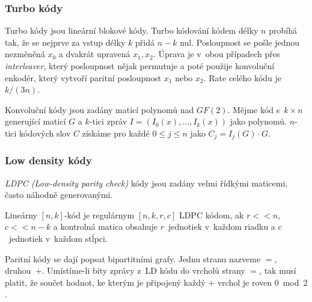 \subsubsection{Turbo kódy}
Turbo kódy jsou lineární blokové kódy.
Turbo kódování kódem délky $n$ probíhá tak, že se nejprve za vstup délky $k$ přidá $n -
k$ nul. Posloupnost se pošle jednou nezměněná $x_0$ a dvakrát upravená
$x_1, x_2$. Úprava
je v~obou případech přes {\em interleaver}, který posloupnost nějak
permutuje a poté použije konvoluční enkodér, který vytvoří paritní
posloupnost $x_1$ nebo $x_2$. Rate celého kódu je $k/(3n)$.

Konvoluční kódy jsou zadány maticí polynomů nad $GF(2)$. Mějme kód
s~$k\times n$ generující maticí $G$ a $k$-tici zpráv
$I = (I_0(x),\ldots,I_k(x))$ jako polynomů. $n$-tici kódových slov
$C$ získáme pro každé $0 \leq j \leq n$ jako $C_j = I_j(G) \cdot G$.

\subsubsection{Low density kódy}


{\em LDPC (Low-density parity check)} kódy jsou zadány velmi řídkými maticemi, často náhodně
generovanými. 

Lineárny $[n,k]$-kód je regulárnym $[n,k,r,c]$ LDPC kódom, ak $r << n$,
$c << n-k$ a kontrolná matica obsahuje $r$~jednotiek v~každom riadku
a $c$~jednotiek v~každom stĺpci.

Paritní kódy se dají popsat bipartitními grafy.
Jednu stranu nazveme $=$, druhou~$+$. Umístíme-li bity zprávy z~LD kódu
do vrcholů strany $=$, tak musí platit, že součet hodnot, ke kterým je
připojený každý $+$ vrchol je roven $0$~mod~$2$.

